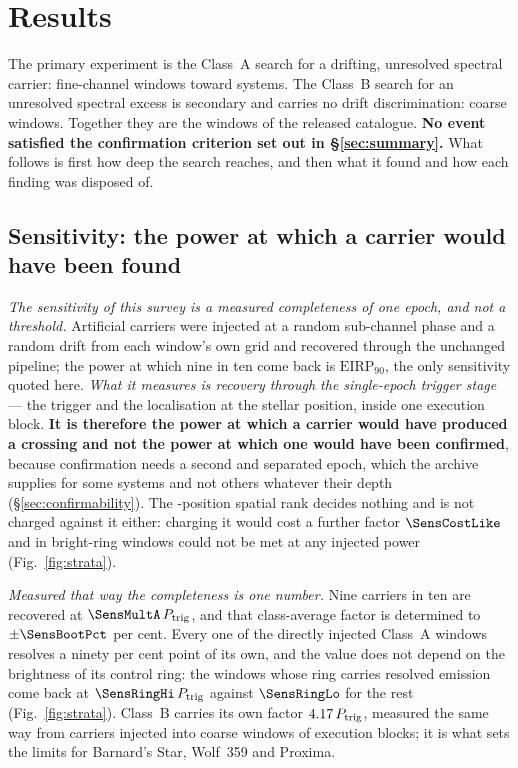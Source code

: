 \section{Results}
\label{sec:results}

The primary experiment is the Class~A search for a drifting, unresolved
spectral carrier: \NWinA{} fine-channel windows toward \NSysClassA{}
systems. The Class~B search for an unresolved spectral excess is secondary
and carries no drift discrimination: \NWinB{} coarse windows. Together they
are the \NWindows{} windows of the released catalogue. \textbf{No event
satisfied the confirmation criterion set out in \S\ref{sec:summary}.} What
follows is first how deep the search reaches, and then what it found and how
each finding was disposed of.

\subsection{Sensitivity: the power at which a carrier would have been
found} \label{sec:pninetysel}

\emph{The sensitivity of this survey is a measured completeness of one epoch,
and not a threshold.} Artificial carriers were injected at a random
sub-channel phase and a random drift from each window's own grid and recovered
through the unchanged pipeline; the power at which nine in ten come back is
$\mathrm{EIRP}_{90}$, the only sensitivity quoted here. \emph{What it
measures is recovery through the single-epoch trigger stage} --- the trigger and the localisation at the stellar position,
inside one execution block. \textbf{It is therefore the power at which a
carrier would have produced a crossing and not the power at which one would
have been confirmed}, because confirmation needs a second and separated epoch,
which the archive supplies for some systems and not others whatever their
depth (\S\ref{sec:confirmability}). The \NCtrl-position spatial rank decides
nothing and is not charged against it either: charging it would cost a further
factor $\SensCostLike$ and in \SensNRingHiUnres{} bright-ring windows could not
be met at any injected power (Fig.~\ref{fig:strata}).

\emph{Measured that way the completeness is one number.} Nine carriers in ten
are recovered at $\SensMultA\,P_{\rm trig}$, and that class-average factor is
determined to $\pm\SensBootPct$ per cent. Every one of the \SensNInj{} directly
injected Class~A windows resolves a ninety per cent point of its own, and the
value does not depend on the brightness of its control ring: the
\SensNRingHi{} windows whose ring carries resolved emission come back at $\SensRingHi\,P_{\rm trig}$
against $\SensRingLo$ for the rest (Fig.~\ref{fig:strata}). Class~B carries
its own factor $4.17\,P_{\rm trig}$, measured the same way from
\SensNToneCoarse{} carriers injected into \SensNInjCoarse{} coarse windows of
\SensNInjCoarseBlock{} execution blocks; it is what sets the limits for
Barnard's Star, Wolf~359 and Proxima.

